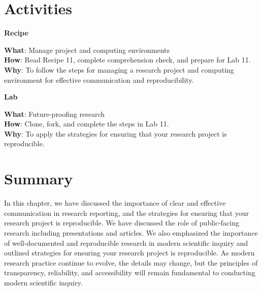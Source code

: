 \documentclass[
  letterpaper,
]{latex/krantz}
\theoremstyle{definition}
\theoremstyle{remark}
\begin{document}
\section*{Activities}\label{activities-9}


\begin{tcolorbox}[enhanced jigsaw, breakable, leftrule=.75mm, arc=.35mm, colframe=quarto-callout-color-frame, colback=white, left=2mm, bottomrule=.15mm, rightrule=.15mm, toprule=.15mm, opacityback=0]

\textbf{ Recipe}

\textbf{What}: Manage project and computing environments\\
\textbf{How}: Read Recipe 11, complete comprehension check, and prepare
for Lab 11.\\
\textbf{Why}: To follow the steps for managing a research project and
computing environment for effective communication and reproducibility.

\end{tcolorbox}

\begin{tcolorbox}[enhanced jigsaw, breakable, leftrule=.75mm, arc=.35mm, colframe=quarto-callout-color-frame, colback=white, left=2mm, bottomrule=.15mm, rightrule=.15mm, toprule=.15mm, opacityback=0]

\textbf{ Lab}

\textbf{What}: Future-proofing research\\
\textbf{How}: Clone, fork, and complete the steps in Lab 11.\\
\textbf{Why}: To apply the strategies for ensuring that your research
project is reproducible.

\end{tcolorbox}

\section*{Summary}\label{summary-10}


In this chapter, we have discussed the importance of clear and effective
communication in research reporting, and the strategies for ensuring
that your research project is reproducible. We have discussed the role
of public-facing research including presentations and articles. We also
emphasized the importance of well-documented and reproducible research
in modern scientific inquiry and outlined strategies for ensuring your
research project is reproducible. As modern research practice continue
to evolve, the details may change, but the principles of transparency,
reliability, and accessibility will remain fundamental to conducting
modern scientific inquiry.
\end{document}
